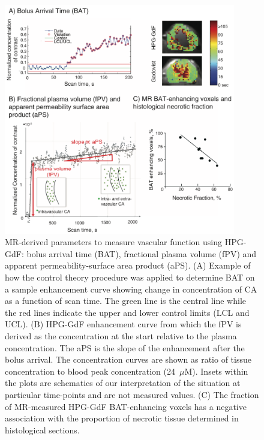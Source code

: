 \begin{figure}[htbp]
 \includegraphics[width=0.9\textwidth]{hpg/hpg-paper1-images/hpg_fig2-bat.png}
 \caption{MR-derived parameters to measure vascular function using \acs{HPG-GdF}: bolus arrival time (\acs{BAT}), fractional plasma volume (\acs{fPV}) and apparent permeability-surface area product (\acs{aPS}). 
 (A) Example of how the control theory procedure was applied to determine \acs{BAT} on a sample enhancement curve showing change in concentration of \acs{CA} as a function of scan time. 
 The green line is the central line while the red lines indicate the upper and lower control limits (LCL and UCL).
 (B) \acs{HPG-GdF} enhancement curve from which the \acs{fPV} is derived as the concentration at the start relative to the plasma concentration. The \acs{aPS} is the slope of the enhancement after the bolus arrival. 
 The concentration curves are shown as ratio of tissue concentration to blood peak concentration (24~$\mu$M).
 Insets within the plots are schematics of our interpretation of the situation at particular time-points and are not measured values.
 (C) The fraction of MR-measured \acs{HPG-GdF} \acs{BAT}-enhancing voxels has a negative association with the proportion of necrotic tissue determined in histological sections.}
 \label{hpgpaper1:fig2}
\end{figure}

